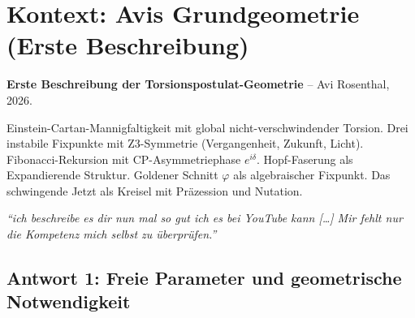 
\begin{abstract}
Dieses Dokument sammelt den wissenschaftlichen Dialog zwischen der T0-Theorie / Fundamentalen Fraktalen Geometrischen Feldtheorie (FFGFT) und dem Geometrieprogramm von Avi Rosenthal (2026). Beide Ansätze konvergieren unabhängig auf dieselben mathematischen Strukturen: fraktale Selbstähnlichkeit, Torus-Topologie, Fibonacci-Dynamik, goldener Schnitt als geometrischer Attraktor, und die Ableitbarkeit physikalischer Parameter aus einer einzigen geometrischen Quelle. Der Dialog dokumentiert die schrittweise Identifikation von Berührungspunkten und offenen Forschungsfragen.
\end{abstract}

\newpage

\section{Kontext: Avis Grundgeometrie (Erste Beschreibung)}

\begin{avipost}
\textbf{Erste Beschreibung der Torsionspostulat-Geometrie} -- Avi Rosenthal, 2026.

\medskip
Einstein-Cartan-Mannigfaltigkeit mit global nicht-verschwindender Torsion. Drei instabile Fixpunkte mit Z3-Symmetrie (Vergangenheit, Zukunft, Licht). Fibonacci-Rekursion mit CP-Asymmetriephase $e^{i\delta}$. Hopf-Faserung als Expandierende Struktur. Goldener Schnitt $\varphi$ als algebraischer Fixpunkt. Das schwingende Jetzt als Kreisel mit Präzession und Nutation.

\medskip
\textit{``ich beschreibe es dir nun mal so gut ich es bei YouTube kann [\ldots] Mir fehlt nur die Kompetenz mich selbst zu überprüfen.''}
\end{avipost}

\subsection{Antwort 1: Freie Parameter und geometrische Notwendigkeit}

